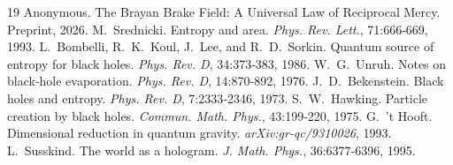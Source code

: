 \documentclass[11pt]{article}
\begin{document}
\begin{thebibliography}{19}
Anonymous. The Brayan Brake Field: A Universal Law of Reciprocal Mercy. Preprint, 2026.
M.~Srednicki. Entropy and area. \emph{Phys. Rev. Lett.}, 71:666‑669, 1993.
L.~Bombelli, R.~K.~Koul, J.~Lee, and R.~D.~Sorkin. Quantum source of entropy for black holes. \emph{Phys. Rev. D}, 34:373‑383, 1986.
W.~G.~Unruh. Notes on black‑hole evaporation. \emph{Phys. Rev. D}, 14:870‑892, 1976.
J.~D.~Bekenstein. Black holes and entropy. \emph{Phys. Rev. D}, 7:2333‑2346, 1973.
S.~W.~Hawking. Particle creation by black holes. \emph{Commun. Math. Phys.}, 43:199‑220, 1975.
G.~'t Hooft. Dimensional reduction in quantum gravity. \emph{arXiv:gr‑qc/9310026}, 1993.
L.~Susskind. The world as a hologram. \emph{J. Math. Phys.}, 36:6377‑6396, 1995.
\end{thebibliography}
\end{document}
